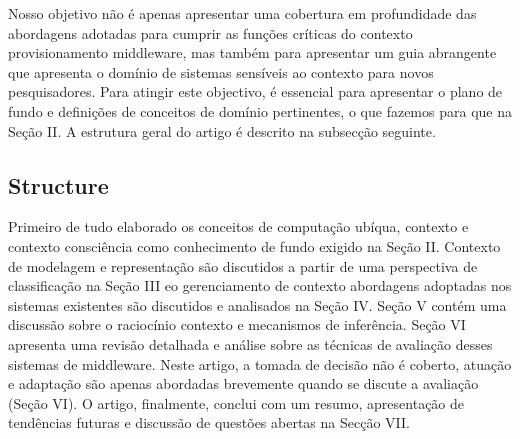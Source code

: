 \documentclass[12pt]{article} %
\begin{document}

Nosso objetivo não é apenas apresentar uma cobertura em profundidade das abordagens adotadas para cumprir as funções críticas do contexto provisionamento middleware, mas também para apresentar um guia abrangente que apresenta o domínio de sistemas sensíveis ao contexto para novos pesquisadores. Para atingir este objectivo, é essencial para apresentar o plano de fundo e definições de conceitos de domínio pertinentes, o que fazemos para que na Seção II. A estrutura geral do artigo é descrito na subsecção seguinte.


\subsection{Structure} %


Primeiro de tudo elaborado os conceitos de computação ubíqua, contexto e contexto consciência como conhecimento de fundo exigido na Seção II. Contexto de modelagem e representação são discutidos a partir de uma perspectiva de classificação na Seção III eo gerenciamento de contexto abordagens adoptadas nos sistemas existentes são discutidos e analisados na Seção IV. Seção V contém uma discussão sobre o raciocínio contexto e mecanismos de inferência. Seção VI apresenta uma revisão detalhada e análise sobre as técnicas de avaliação desses sistemas de middleware. Neste artigo, a tomada de decisão não é coberto, atuação e adaptação são apenas abordadas brevemente quando se discute a avaliação (Seção VI). O artigo, finalmente, conclui com um resumo, apresentação de tendências futuras e discussão de questões abertas na Secção VII.
\end{document}
